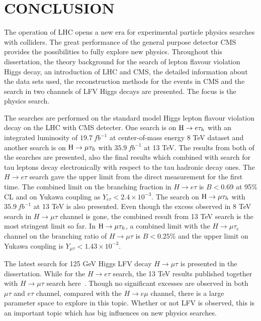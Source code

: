 
\chapter{CONCLUSION}

The operation of LHC opens a new era for experimental particle physics searches with colliders. The great performance of the general purpose detector CMS provides the possibilities to fully explore new physics. Throughout this dissertation, the theory background for the search of lepton flavour violation Higgs decay, an introduction of LHC and CMS, the detailed information about the data sets used, the reconstruction methods for the events in CMS and the search in two channels of LFV Higgs decays are presented. The focus is the physics search. 

  
The searches are performed on the standard model Higgs lepton flavour violation decay on the LHC with CMS detecter. One search is on $\mathrm{H} \to e \tau_{h}$ with an integrated luminosity of $19.7~fb^{-1}$ at center-of-mass energy 8 TeV dataset and another search is on $\mathrm{H}\to \mu\tau_{h}$ with $35.9~fb^{-1}$ at 13 TeV. The results from both of the searches are presented, also the final results which combined with search for tau leptons decay electronically with respect to the tau hadronic decay ones. The $H \to e \tau$ search gave the upper limit from the direct measurement for the first time. The combined limit on the branching fraction in $H \to e\tau$ is $B<0.69$ at 95\% CL and on Yukawa coupling as $Y_{e\tau}<2.4\times10^{-3}$. The search on $\mathrm{H}\to \mu\tau_{h}$ with $35.9~fb^{-1}$ at 13 TeV is also presented. Even though the excess observed in 8 TeV search in $H \to \mu \tau$ channel is gone, the combined result from 13 TeV search is the most stringent limit so far. In $\mathrm{H}\to \mu\tau_{h}$, a combined limit with the $H \to \mu \tau_{e}$ channel on the branching ratio of $H \to \mu\tau$ is $B<0.25\%$ and the upper limit on Yukawa coupling is $Y_{\mu\tau}<1.43\times10^{-3}$.   

The latest search for 125 GeV Higgs LFV decay $H \to \mu \tau$ is presented in the dissertation. While for the $H \to e \tau$ search, the 13 TeV results published together with $H \to \mu \tau$ search here~\cite{Sirunyan2018}. Though no significant excesses are observed in both $\mu\tau$ and $e\tau$ channel, compared with the $H \to e \mu$ channel, there is a large parameter space to explore in this topic. Whether or not LFV is observed, this is an important topic which has big influences on new physics searches.  









